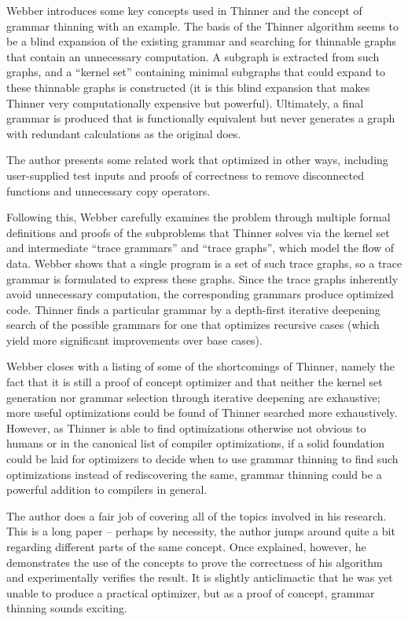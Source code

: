 \documentclass[12pt,letterpaper]{article}
\begin{document}
Webber introduces some key concepts used in Thinner and the concept of grammar
thinning with an example. The basis of the Thinner algorithm seems to be
a blind expansion of the existing grammar and searching for thinnable graphs
that contain an unnecessary computation. A subgraph is extracted from such
graphs, and a ``kernel set'' containing minimal subgraphs that could expand to
these thinnable graphs is constructed (it is this blind expansion that makes
Thinner very computationally expensive but powerful). Ultimately, a final
grammar is produced that is functionally equivalent but never generates a graph
with redundant calculations as the original does.

The author presents some related work that optimized in other ways, including
user-supplied test inputs and proofs of correctness to remove disconnected
functions and unnecessary copy operators.

Following this, Webber carefully examines the problem through multiple formal
definitions and proofs of the subproblems that Thinner solves via the kernel
set and intermediate ``trace grammars'' and ``trace graphs'', which model the
flow of data. Webber shows that a single program is a set of such trace graphs,
so a trace grammar is formulated to express these graphs. Since the trace
graphs inherently avoid unnecessary computation, the corresponding grammars
produce optimized code. Thinner finds a particular grammar by a depth-first
iterative deepening search of the possible grammars for one that optimizes
recursive cases (which yield more significant improvements over base cases).

Webber closes with a listing of some of the shortcomings of Thinner, namely the
fact that it is still a proof of concept optimizer and that neither the kernel
set generation nor grammar selection through iterative deepening are
exhaustive; more useful optimizations could be found of Thinner searched more
exhaustively. However, as Thinner is able to find optimizations otherwise not
obvious to humans or in the canonical list of compiler optimizations, if
a solid foundation could be laid for optimizers to decide when to use grammar
thinning to find such optimizations instead of rediscovering the same, grammar
thinning could be a powerful addition to compilers in general.

The author does a fair job of covering all of the topics involved in his
research. This is a long paper -- perhaps by necessity, the author jumps around
quite a bit regarding different parts of the same concept. Once explained,
however, he demonstrates the use of the concepts to prove the correctness of
his algorithm and experimentally verifies the result. It is slightly
anticlimactic that he was yet unable to produce a practical optimizer, but as
a proof of concept, grammar thinning sounds exciting.
\end{document}
